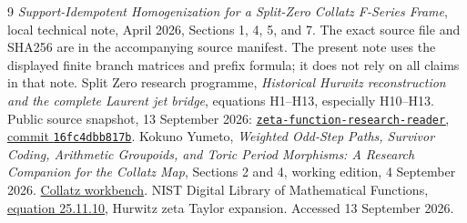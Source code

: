 \documentclass[11pt]{amsart}
\theoremstyle{remark}\newtheorem{remark}[theorem]{Remark}
\begin{document}
\begin{thebibliography}{9}
 \emph{Support-Idempotent Homogenization for a Split-Zero
Collatz F-Series Frame}, local technical note, April 2026, Sections 1,
4, 5, and 7. The exact source file and SHA256 are in the accompanying
source manifest. The present note uses the displayed finite branch
matrices and prefix formula; it does not rely on all claims in that note.
 Split Zero research programme,
\emph{Historical Hurwitz reconstruction and the complete Laurent jet bridge},
equations H1--H13, especially H10--H13. Public source snapshot,
13 September 2026:
\href{https://github.com/KokunoYumeto/zeta-function-research-reader/blob/16fc4dbb817b82023c6126e636f1c6df28d4cecd/workbenches/splitzero-tandem/continuations/20260913-toda/tex/historical_hurwitz_jets.tex}{\texttt{zeta-function-research-reader}, commit \texttt{16fc4dbb817b}}.
 Kokuno Yumeto,
\emph{Weighted Odd-Step Paths, Survivor Coding, Arithmetic Groupoids, and
Toric Period Morphisms: A Research Companion for the Collatz Map},
Sections 2 and 4, working edition, 4 September 2026.
\href{https://www.overleaf.com/read/vgsnwwgbrnsm\#2eec34}{Collatz workbench}.
 NIST Digital Library of Mathematical Functions,
\href{https://dlmf.nist.gov/25.11.E10}{equation 25.11.10}, Hurwitz zeta
Taylor expansion. Accessed 13 September 2026.
\end{thebibliography}
\end{document}
